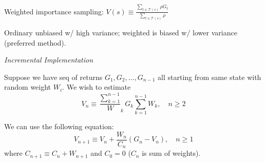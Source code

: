 \documentclass[twocolumn]{article}
\begin{document}
Weighted importance sampling: $V(s) \equiv \frac{\sum_{t \in \mathcal T(s)} \rho G_t}{\sum_{t \in \mathcal T(s)} \rho}$

Ordinary unbiased w/ high variance; weighted is biased w/ lower variance (preferred method).

\vspace{-.5em}
\dotfill

\textit{Incremental Implementation}

Suppose we have seq of returns $G_1, G_2, \dots, G_{n-1}$ all starting from same state with random weight $W_i$. We wish to estimate
\begin{equation*}
    V_n \equiv \frac{\sum_{k=1}^{n-1}} W_k G_k{\sum_{k=1}^{n-1} W_k}, \quad n \geq 2
\end{equation*}

We can use the following equation:
\begin{equation*}
    V_{n+1} \equiv V_n + \frac{W_n}{C_n} (G_n - V_n), \quad n \geq 1
\end{equation*}
where $C_{n+1} \equiv C_n + W_{n+1}$ and $C_0 = 0$ ($C_n$ is sum of weights).

\newpage
\end{document}
